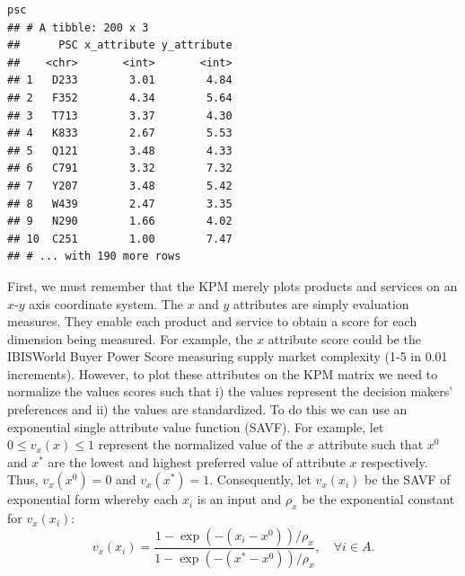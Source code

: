 \documentclass[twocolumn]{svjour3}       %
\begin{document}
\begin{Verbatim}[fontsize=\footnotesize]
psc
## # A tibble: 200 x 3
##      PSC x_attribute y_attribute
##    <chr>       <int>       <int>
## 1   D233        3.01        4.84
## 2   F352        4.34        5.64
## 3   T713        3.37        4.30
## 4   K833        2.67        5.53
## 5   Q121        3.48        4.33
## 6   C791        3.32        7.32
## 7   Y207        3.48        5.42
## 8   W439        2.47        3.35
## 9   N290        1.66        4.02
## 10  C251        1.00        7.47
## # ... with 190 more rows
\end{Verbatim}

First, we must remember that the KPM merely plots products and services on an $x$-$y$ axis coordinate system.  The $x$ and $y$ attributes are simply evaluation measures. They enable each product and service to obtain a score for each dimension being measured. For example, the $x$ attribute score could be the IBISWorld Buyer Power Score measuring supply market complexity (1-5 in 0.01 increments). However, to plot these attributes on the KPM matrix we need to normalize the values scores such that i) the values represent the decision makers' preferences and ii) the values are standardized. To do this we can use an exponential single attribute value function (SAVF). For example, let $0 \le v_x\left(x\right) \le 1$ represent the normalized value of the $x$ attribute such that $x^0$ and $x^*$ are the lowest and highest preferred value of attribute $x$ respectively. Thus, $v_x\left(x^0\right) = 0$ and $v_x\left(x^*\right) = 1$. Consequently, let $v_x\left(x_i\right)$ be the SAVF of exponential form whereby each $x_i$ is an input and $\rho_x$ be the exponential constant for $v_x\left(x_i\right)$:
\begin{equation}
\label{eqn:1}
v_x\left(x_i\right) = \frac{1 - \exp\left(-\left(x_i - x^0\right)\right) / \rho_x}{1 - \exp\left(-\left(x^* - x^0\right)\right) / \rho_x}, \quad \forall i \in A.
\end{equation}
\end{document}
